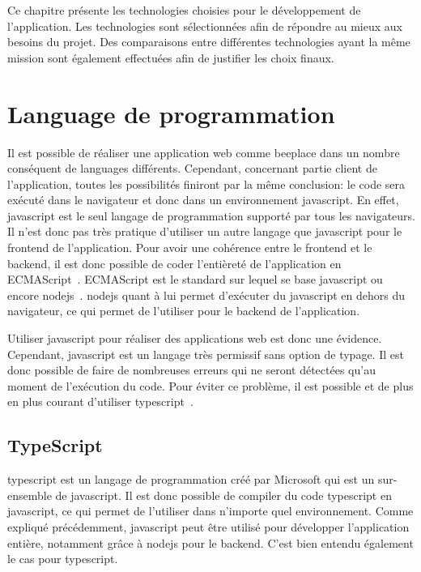 Ce chapitre présente les technologies choisies pour le développement de l'application. Les technologies sont sélectionnées afin de répondre au mieux aux besoins du projet. Des comparaisons entre différentes technologies ayant la même mission sont également effectuées afin de justifier les choix finaux.

\section{Language de programmation}

Il est possible de réaliser une application web comme \gls{beeplace} dans un nombre conséquent de languages différents. Cependant, concernant partie client de l'application, toutes les possibilités finiront par la même conclusion: le code sera exécuté dans le navigateur et donc dans un environnement \gls{javascript}. En effet, \gls{javascript} est le seul langage de programmation supporté par tous les navigateurs. Il n'est donc pas très pratique d'utiliser un autre langage que \gls{javascript} pour le frontend de l'application. Pour avoir une cohérence entre le frontend et le backend, il est donc possible de coder l'entièreté de l'application en ECMAScript~\cite{ecmascript}. ECMAScript est le standard sur lequel se base \gls{javascript} ou encore \gls{nodejs}~\cite{nodejs}. \gls{nodejs} quant à lui permet d'exécuter du \gls{javascript} en dehors du navigateur, ce qui permet de l'utiliser pour le backend de l'application.

Utiliser \gls{javascript} pour réaliser des applications web est donc une évidence. Cependant, \gls{javascript} est un langage très permissif sans option de typage. Il est donc possible de faire de nombreuses erreurs qui ne seront détectées qu'au moment de l'exécution du code. Pour éviter ce problème, il est possible et de plus en plus courant d'utiliser \gls{typescript}~\cite{typescript}.

\subsection{TypeScript}

\gls{typescript} est un langage de programmation créé par Microsoft qui est un sur-ensemble de \gls{javascript}. Il est donc possible de compiler du code \gls{typescript} en \gls{javascript}, ce qui permet de l'utiliser dans n'importe quel environnement. Comme expliqué précédemment, \gls{javascript} peut être utilisé pour développer l'application entière, notamment grâce à \gls{nodejs} pour le backend. C'est bien entendu également le cas pour \gls{typescript}.

